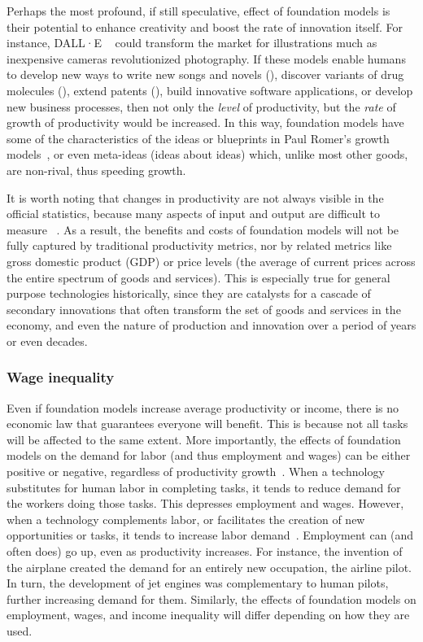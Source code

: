 Perhaps the most profound, if still speculative, effect of foundation models is their potential to enhance creativity and boost the rate of innovation itself.
For instance, DALL·E ~\citep{ramesh2021zeroshot} could transform the market for illustrations much as inexpensive cameras revolutionized photography. 
If these models enable humans to develop new ways to write new songs and novels (), discover variants of drug molecules (), extend patents (), build innovative software applications, or develop new business processes, then not only the \textit{level} of productivity, but the \textit{rate} of growth of productivity would be increased.
In this way, foundation models have some of the characteristics of the ideas or blueprints in Paul Romer's growth models~\citep{romer1990endogenous}, or even meta-ideas (ideas about ideas) which, unlike most other goods, are non-rival, thus speeding growth.

It is worth noting that changes in productivity are not always visible in the official statistics, because many aspects of input and output are difficult to measure ~\citep{BrynjolfssonErik2019Hswm}.
As a result, the benefits and costs of foundation models will not be fully captured by traditional productivity metrics, nor by related metrics like gross domestic product (GDP) or price levels (the average of current prices across the entire spectrum of goods and services).
This is especially true for general purpose technologies historically, since they are catalysts for a cascade of secondary innovations that often transform the set of goods and services in the economy, 
and even the nature of production and innovation over a period of years or even decades.


\subsubsection{Wage inequality}
Even if foundation models increase average productivity or income, there is no economic law that guarantees everyone will benefit.
This is because not all tasks will be affected to the same extent.
More importantly, the effects of foundation models on the demand for labor (and thus employment and wages) can be either positive or negative, regardless of productivity growth~\citep{brynolfsson2011race,brynjolfsson2017can}. 
When a technology substitutes for human labor in completing tasks, it tends to reduce demand for the workers doing those tasks. 
This depresses employment and wages. 
However, when a technology complements labor, or facilitates the creation of new opportunities or tasks, it tends to increase labor demand~\citep{acemoglu2019automation}. 
Employment can (and often does) go up, even as productivity increases.
For instance, the invention of the airplane created the demand for an entirely new occupation, the airline pilot.
In turn, the development of jet engines was complementary to human pilots, further increasing demand for them.
Similarly, the effects of foundation models on employment, wages, and income inequality will differ depending on how they are used.

